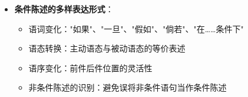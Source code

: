 \begin{center}
{{\begin{itemize}
\begin{itemize}
  \item \textbf{基本符号化}："$q$是$p$的必要条件"和"$p$仅当$q$"符号化为$p \supset q$
  \item \textbf{充分条件}："$p$是$q$的充分条件"符号化为$p \supset q$
  \item \textbf{逻辑关系}：充分条件与必要条件的相互转换关系
  \item \textbf{对称性}：必要且充分条件的双向关系
  \item \textbf{传递性}：充分条件关系的传递性质
  \item \textbf{实际应用}：科学、法律、数学中的具体例子
  \item {}：混淆必要条件和充分条件的危险
  \end{itemize}
\item \textbf{条件陈述的多样表达形式}：
  \begin{itemize}
  \item 语词变化："如果"、"一旦"、"假如"、"倘若"、"在……条件下"
  \item 语态转换：主动语态与被动语态的等价表述
  \item 语序变化：前件后件位置的灵活性
  \item 非条件陈述的识别：避免误将非条件语句当作条件陈述
  \end{itemize}
\end{itemize}
}}
\end{center}